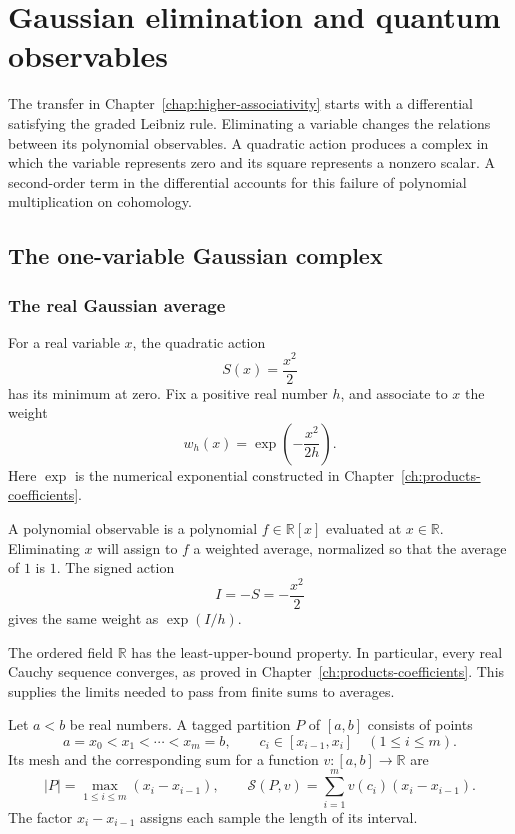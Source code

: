 \chapter{Gaussian elimination and quantum observables}
\label{chap:gaussian-observables}

The transfer in Chapter~\ref{chap:higher-associativity} starts with a
differential satisfying the graded Leibniz rule.
Eliminating a variable changes the relations between its polynomial
observables. A quadratic action produces a complex in which the variable
represents zero and its square represents a nonzero scalar.
A second-order term in the differential accounts for this failure of
polynomial multiplication on cohomology.

\section{The one-variable Gaussian complex}
\label{sec:gaussian-one-variable}

\subsection{The real Gaussian average}

For a real variable $x$, the quadratic action
\[
 S(x)=\frac{x^2}{2}
\]
has its minimum at zero. Fix a positive real number $h$, and associate
to $x$ the weight
\[
 w_h(x)=\exp\!\left(-\frac{x^2}{2h}\right).
\]
Here $\exp$ is the numerical exponential constructed in
Chapter~\ref{ch:products-coefficients}.

A polynomial observable is a polynomial $f\in\mathbb R[x]$ evaluated at
$x\in\mathbb R$.
Eliminating $x$ will assign to $f$ a weighted average, normalized so that
the average of $1$ is $1$.
The signed action
\[
 I=-S=-\frac{x^2}{2}
\]
gives the same weight as $\exp(I/h)$.

The ordered field $\mathbb R$ has the least-upper-bound property.
In particular, every real Cauchy sequence converges, as proved in
Chapter~\ref{ch:products-coefficients}.
This supplies the limits needed to pass from finite sums to averages.

Let $a<b$ be real numbers.
A tagged partition $P$ of $[a,b]$ consists of points
\[
 a=x_0<x_1<\cdots<x_m=b,
 \qquad c_i\in[x_{i-1},x_i]\quad(1\leq i\leq m).
\]
Its mesh and the corresponding sum for a function
$v:[a,b]\to\mathbb R$ are
\[
 |P|=\max_{1\leq i\leq m}(x_i-x_{i-1}),
 \qquad
 \mathcal S(P,v)=\sum_{i=1}^m v(c_i)(x_i-x_{i-1}).
\]
The factor $x_i-x_{i-1}$ assigns each sample the length of its interval.

